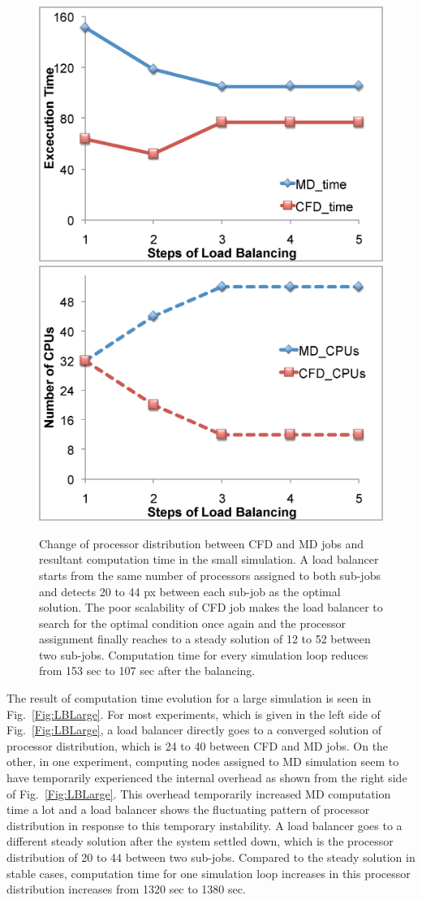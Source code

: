 \documentclass[preprint,12pt]{elsarticle}
\begin{document}
\begin{figure}
\centering
\includegraphics[width=0.4\linewidth]{fig6_1.eps}
\includegraphics[width=0.4\linewidth]{fig6_2.eps}
\caption{\small Change of processor distribution between CFD and MD
  jobs and resultant computation time in the small simulation. A load
  balancer starts from the same number of processors assigned to both
  sub-jobs and detects 20 to 44 px between each sub-job as the optimal
  solution. The poor scalability of CFD job makes the load balancer to
  search for the optimal condition once again and the processor
  assignment finally reaches to a steady solution of 12 to 52 between
  two sub-jobs. Computation time for every simulation loop reduces
  from 153 sec to 107 sec after the balancing.}
\label{Fig:LBSmall}
\vspace{-1em}
\end{figure}


The result of computation time evolution for a large simulation is seen in Fig.~\ref{Fig:LBLarge}. For most experiments, which is given in the left side of Fig.~\ref{Fig:LBLarge}, a load balancer directly goes to a converged solution of processor distribution, which is 24 to 40 between CFD and MD jobs. On the other, in one experiment, computing nodes assigned to MD simulation seem to have temporarily experienced the internal overhead as shown from the right side of Fig.~\ref{Fig:LBLarge}. This overhead temporarily increased MD computation time a lot and a load balancer shows the fluctuating pattern of processor distribution in response to this temporary instability. A load balancer goes to a different steady solution after the system settled down, which is the processor distribution of 20 to 44 between two sub-jobs. Compared to the steady solution in stable cases, computation time for one simulation loop increases in this processor distribution increases from 1320 sec to 1380 sec.
\end{document}
